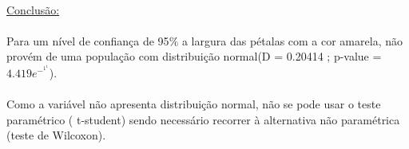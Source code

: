 \documentclass{article}
\begin{document}
\paragraph{}\underline{Conclusão:}
\paragraph{}Para um nível de confiança de 95$\%$ a largura das pétalas com a cor amarela, não provém de uma população com distribuição normal(D = 0.20414 ; p-value = \begin{math}4.419e^-^1^1\end{math}).
\paragraph{}Como a variável não apresenta distribuição normal, não se pode usar o teste paramétrico ( t-student) sendo necessário recorrer à alternativa não paramétrica (teste de Wilcoxon).


\paragraph{}
\paragraph{}
\paragraph{}
\paragraph{}
\paragraph{}
\paragraph{}
\paragraph{}
\paragraph{}
\paragraph{}
\end{document}
